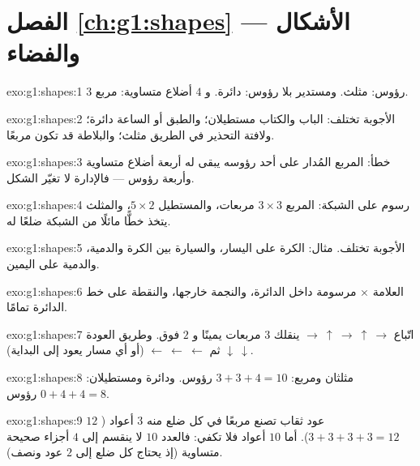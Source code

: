 \section*{الفصل \ref{ch:g1:shapes} --- الأشكال والفضاء}

\begin{solution}{exo:g1:shapes:1}
$3$ رؤوس: مثلث. ومستدير بلا رؤوس: دائرة. و $4$ أضلاع
متساوية: مربع.
\end{solution}

\begin{solution}{exo:g1:shapes:2}
الأجوبة تختلف: الباب والكتاب مستطيلان؛ والطبق أو الساعة
دائرة؛ ولافتة التحذير في الطريق مثلث؛ والبلاطة قد تكون
مربعًا.
\end{solution}

\begin{solution}{exo:g1:shapes:3}
خطأ: المربع المُدار على أحد رؤوسه يبقى له أربعة أضلاع متساوية
وأربعة رؤوس --- فالإدارة لا تغيّر الشكل.
\end{solution}

\begin{solution}{exo:g1:shapes:4}
رسوم على الشبكة: المربع $3 \times 3$ مربعات، والمستطيل
$5 \times 2$، والمثلث يتخذ خطًّا مائلًا من الشبكة ضلعًا
له.
\end{solution}

\begin{solution}{exo:g1:shapes:5}
الأجوبة تختلف. مثال: الكرة على اليسار، والسيارة بين الكرة
والدمية، والدمية على اليمين.
\end{solution}

\begin{solution}{exo:g1:shapes:6}
العلامة × مرسومة داخل الدائرة، والنجمة خارجها، والنقطة على
خط الدائرة تمامًا.
\end{solution}

\begin{solution}{exo:g1:shapes:7}
اتّباع $\to\ \uparrow\ \to\ \uparrow\ \to$ ينقلك $3$ مربعات
يمينًا و $2$ فوق. وطريق العودة $\downarrow\ \downarrow$ ثم
$\leftarrow\ \leftarrow\ \leftarrow$ (أو أي مسار يعود إلى
البداية).
\end{solution}

\begin{solution}{exo:g1:shapes:8}
مثلثان ومربع: $3 + 3 + 4 = 10$ رؤوس. ودائرة
ومستطيلان: $0 + 4 + 4 = 8$ رؤوس.
\end{solution}

\begin{solution}{exo:g1:shapes:9}
$12$ عود ثقاب تصنع مربعًا في كل ضلع منه $3$ أعواد
($3 + 3 + 3 + 3 = 12$). أما $10$ أعواد فلا تكفي: فالعدد $10$
لا ينقسم إلى $4$ أجزاء صحيحة متساوية (إذ يحتاج كل ضلع إلى $2$ عود
ونصف).
\end{solution}
